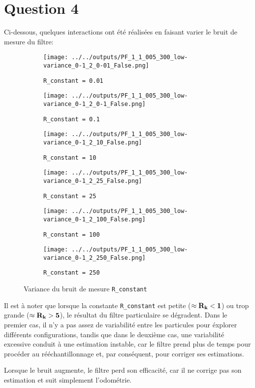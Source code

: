 \documentclass[../CSC_5RO12_TA_TP3.tex]{subfiles}
\begin{document}
\section{Question 4}
\noindent Ci-dessous, quelques interactions ont été réalisées en faisant varier le bruit de mesure du filtre:
\begin{figure}[H]
    \centering
    \begin{subfigure}[b]{0.475\textwidth}
        \centering
        \texttt{[image: ../../outputs/PF\_1\_1\_005\_300\_low-variance\_0-1\_2\_0-01\_False.png]}
        \caption{\texttt{R\_constant = 0.01}}
        \label{}
    \end{subfigure}\hfill
    \begin{subfigure}[b]{0.475\textwidth}
        \centering
        \texttt{[image: ../../outputs/PF\_1\_1\_005\_300\_low-variance\_0-1\_2\_0-1\_False.png]}
        \caption{\texttt{R\_constant = 0.1}}
        \label{}
    \end{subfigure}
    \begin{subfigure}[b]{0.475\textwidth}
        \centering
        \texttt{[image: ../../outputs/PF\_1\_1\_005\_300\_low-variance\_0-1\_2\_10\_False.png]}
        \caption{\texttt{R\_constant = 10}}
        \label{}
    \end{subfigure}\hfill
    \begin{subfigure}[b]{0.475\textwidth}
        \centering
        \texttt{[image: ../../outputs/PF\_1\_1\_005\_300\_low-variance\_0-1\_2\_25\_False.png]}
        \caption{\texttt{R\_constant = 25}}
        \label{}
    \end{subfigure}
    \begin{subfigure}[b]{0.475\textwidth}
        \centering
        \texttt{[image: ../../outputs/PF\_1\_1\_005\_300\_low-variance\_0-1\_2\_100\_False.png]}
        \caption{\texttt{R\_constant = 100}}
        \label{}
    \end{subfigure}\hfill
    \begin{subfigure}[b]{0.475\textwidth}
        \centering
        \texttt{[image: ../../outputs/PF\_1\_1\_005\_300\_low-variance\_0-1\_2\_250\_False.png]}
        \caption{\texttt{R\_constant = 250}}
        \label{}
    \end{subfigure}
    \caption{Variance du bruit de mesure \texttt{R\_constant}}
    \label{}
\end{figure}
\noindent Il est à noter que lorsque la constante \texttt{R\_constant} est petite ($\approx \bf{R}_{k} < 1$) ou trop grande ($\approx \bf{R}_{k} > 5$), le résultat du filtre particulaire se dégradent. Dans le premier cas, il n'y a pas assez de variabilité entre les particules pour éxplorer différents configurations, tandis que dans le deuxième cas, une variabilité excessive conduit à une estimation instable, car le filtre prend plus de temps pour procéder au rééchantillonnage et, par conséquent, pour corriger ses estimations.\\

\begin{remark}
    Lorsque le bruit augmente, le filtre perd son efficacité, car il ne corrige pas son estimation et suit simplement l'odométrie.
\end{remark}
\end{document}
